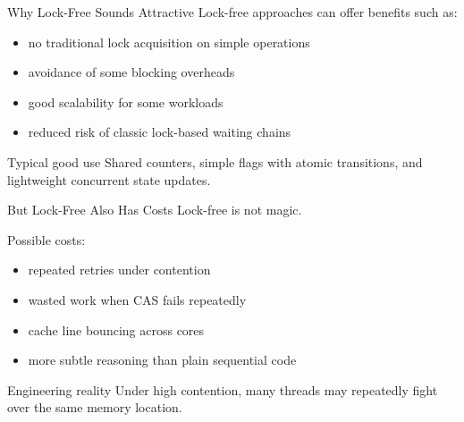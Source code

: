 \documentclass[aspectratio=169,11pt]{beamer}
\begin{document}
	\begin{frame}{Why Lock-Free Sounds Attractive}
		Lock-free approaches can offer benefits such as:
		
		\begin{itemize}
			\item no traditional lock acquisition on simple operations
			\item avoidance of some blocking overheads
			\item good scalability for some workloads
			\item reduced risk of classic lock-based waiting chains
		\end{itemize}
		
		\vspace{0.35cm}
		
		\begin{exampleblock}{Typical good use}
			Shared counters, simple flags with atomic transitions, and lightweight concurrent state updates.
		\end{exampleblock}
	\end{frame}
	
	\begin{frame}{But Lock-Free Also Has Costs}
		Lock-free is not magic.
		
		\vspace{0.3cm}
		
		Possible costs:
		\begin{itemize}
			\item repeated retries under contention
			\item wasted work when CAS fails repeatedly
			\item cache line bouncing across cores
			\item more subtle reasoning than plain sequential code
		\end{itemize}
		
		\vspace{0.35cm}
		
		\begin{alertblock}{Engineering reality}
			Under high contention, many threads may repeatedly fight over the same memory location.
		\end{alertblock}
	\end{frame}
	
\end{document}
